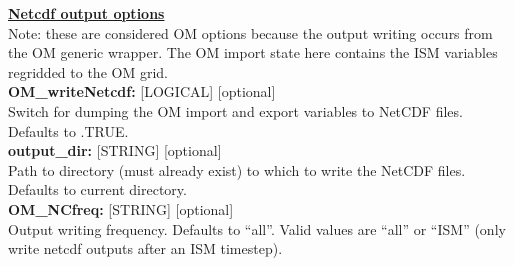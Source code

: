 \documentclass[11pt]{article}
\begin{document}
\begin{flushleft}
\textbf{\underline{Netcdf output options}}                                 \\
Note: these are considered OM options because the output writing occurs 
from the OM generic wrapper.  The OM import state here contains the 
ISM variables regridded to the OM grid.                                    \\
\textbf{OM\_writeNetcdf:}   [LOGICAL] [optional]                           \\
Switch for dumping the OM import and export variables to NetCDF files.
Defaults to .TRUE.                                                         \\
\vspace{6pt}
\textbf{output\_dir:}  [STRING] [optional]                                 \\
Path to directory (must already exist) to which to write the NetCDF files. 
Defaults to current directory.                                             \\
\vspace{6pt}
\textbf{OM\_NCfreq:}  [STRING] [optional]                                 \\
Output writing frequency.
Defaults to ``all''.  Valid values are ``all'' or ``ISM'' (only write 
netcdf outputs after an ISM timestep).
\vspace{22pt}


\end{flushleft}
\end{document}
